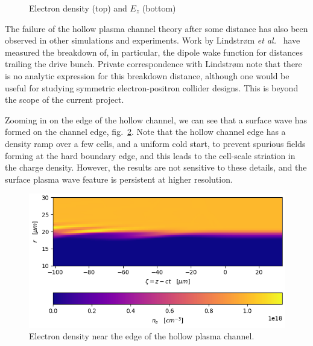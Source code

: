 \documentclass[]{tufte-handout}
\begin{document}
\begin{figure}
\centering
{}
\caption{\protect \label{dens_and_fields} Electron density (top) and $E_z$ (bottom)}
\end{figure}

The failure of the hollow plasma channel theory after some distance has also been observed in other simulations and experiments. Work by Lindstr{\o}m \emph{et al.}~\cite{lindstrom_etal:2018} have measured the breakdown of, in particular, the dipole wake function for distances trailing the drive bunch. Private correspondence with Lindstr{\o}m note that there is no analytic expression for this breakdown distance, although one would be useful for studying symmetric electron-positron collider designs. This is beyond the scope of the current project.

Zooming in on the edge of the hollow channel, we can see that a surface wave has formed on the channel edge, fig.~\ref{zoomedrho}. Note that the hollow channel edge has a density ramp over a few cells, and a uniform cold start, to prevent spurious fields forming at the hard boundary edge, and this leads to the cell-scale striation in the charge density. However, the results are not sensitive to these details, and the surface plasma wave feature is persistent at higher resolution.

\begin{figure}
\centering
\includegraphics[width=0.7\columnwidth]{figures/zoomedrho.png}
\caption{\protect \label{zoomedrho} Electron density near the edge of the hollow plasma channel.}
\end{figure}
\end{document}
